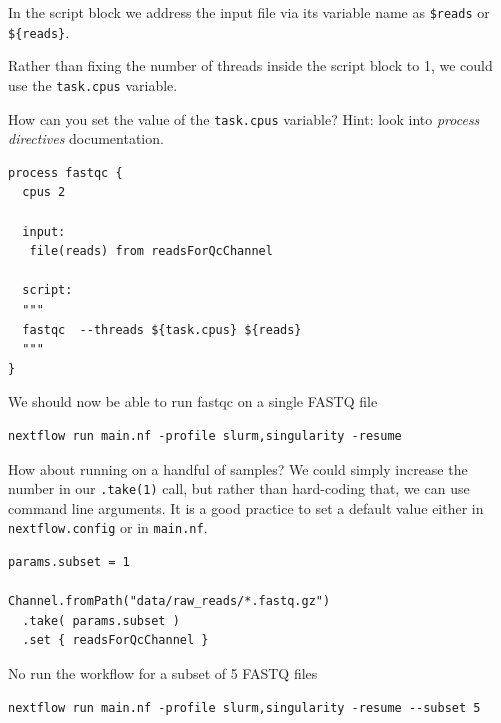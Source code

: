 In the script block we address the input file via its variable name as \texttt{\$reads} or \texttt{\$\{reads\}}.

\begin{bonus}
Rather than fixing the number of threads inside the script block to 1, we could use the \texttt{task.cpus} variable. 

\begin{questions}
How can you set the value of the \texttt{task.cpus} variable? Hint: look into \emph{process directives} documentation.
\begin{answer}
\begin{lstlisting}
process fastqc {
  cpus 2
    
  input:
   file(reads) from readsForQcChannel

  script:
  """
  fastqc  --threads ${task.cpus} ${reads}
  """
}
\end{lstlisting}
\end{answer}
\end{questions}
\end{bonus}


We should now be able to run fastqc on a single FASTQ file

\begin{steps}
\begin{lstlisting}
nextflow run main.nf -profile slurm,singularity -resume
\end{lstlisting}
\end{steps}

How about running on a handful of samples? We could simply increase the number in our \texttt{.take(1)} call, but rather than hard-coding that, we can use command line arguments. It is a good practice to set a default value either in \texttt{nextflow.config} or in \texttt{main.nf}.

\begin{lstlisting}
params.subset = 1

Channel.fromPath("data/raw_reads/*.fastq.gz")
  .take( params.subset )
  .set { readsForQcChannel }
\end{lstlisting}

No run the workflow for a subset of 5 FASTQ files

\begin{steps}
\begin{lstlisting}
nextflow run main.nf -profile slurm,singularity -resume --subset 5
\end{lstlisting}
\end{steps}


